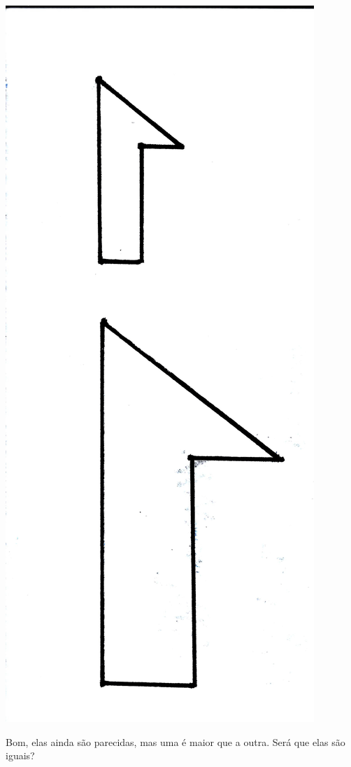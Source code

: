 \documentclass[twoside, 12pt]{article}
\begin{document}
\begin{center}
  \includegraphics[height=0.2\textheight]{img/03-4}
\end{center}

Bom, elas ainda são parecidas, mas uma é maior que a outra. Será que
elas são iguais?
\end{document}
